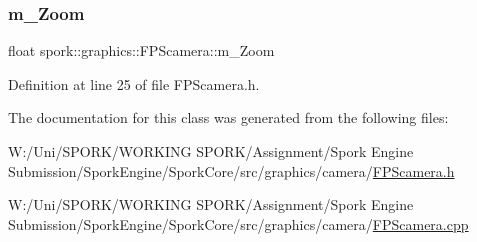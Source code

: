 \subsubsection{\texorpdfstring{m\+\_\+\+Zoom}{m\_Zoom}}
{\footnotesize\ttfamily float spork\+::graphics\+::\+F\+P\+Scamera\+::m\+\_\+\+Zoom}



Definition at line 25 of file F\+P\+Scamera.\+h.



The documentation for this class was generated from the following files\+:\begin{DoxyCompactItemize}
\item 
W\+:/\+Uni/\+S\+P\+O\+R\+K/\+W\+O\+R\+K\+I\+N\+G S\+P\+O\+R\+K/\+Assignment/\+Spork Engine Submission/\+Spork\+Engine/\+Spork\+Core/src/graphics/camera/\hyperlink{_f_p_scamera_8h}{F\+P\+Scamera.\+h}\item 
W\+:/\+Uni/\+S\+P\+O\+R\+K/\+W\+O\+R\+K\+I\+N\+G S\+P\+O\+R\+K/\+Assignment/\+Spork Engine Submission/\+Spork\+Engine/\+Spork\+Core/src/graphics/camera/\hyperlink{_f_p_scamera_8cpp}{F\+P\+Scamera.\+cpp}\end{DoxyCompactItemize}
